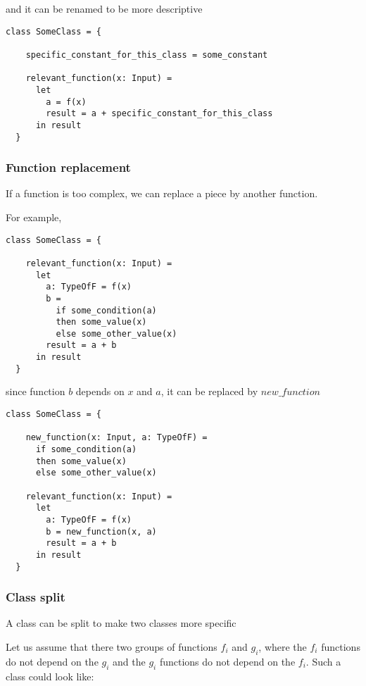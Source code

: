 and it can be renamed to be more descriptive

\begin{lstlisting}[label={lst:rewritingFunctionExtractionAfter1}]
  class SomeClass = {

    specific_constant_for_this_class = some_constant

    relevant_function(x: Input) =
      let
        a = f(x)
        result = a + specific_constant_for_this_class
      in result
  }
\end{lstlisting}

\subsubsection{Function replacement}

If a function is too complex, we can replace a piece by another function.

For example,

\begin{lstlisting}[label={lst:rewritingFunctionReplacementBefore}]
  class SomeClass = {

    relevant_function(x: Input) =
      let
        a: TypeOfF = f(x)
        b =
          if some_condition(a)
          then some_value(x)
          else some_other_value(x)
        result = a + b
      in result
  }
\end{lstlisting}

since function $b$ depends on $x$ and $a$, it can be replaced by $new\_function$

\begin{lstlisting}[label={lst:rewritingFunctionReplacementAfter}]
  class SomeClass = {

    new_function(x: Input, a: TypeOfF) =
      if some_condition(a)
      then some_value(x)
      else some_other_value(x)

    relevant_function(x: Input) =
      let
        a: TypeOfF = f(x)
        b = new_function(x, a)
        result = a + b
      in result
  }
\end{lstlisting}

\subsubsection{Class split}

A class can be split to make two classes more specific

Let us assume that there two groups of functions $f_{i}$ and $g_{i}$, where the $f_{i}$ functions do not depend on the $g_{i}$ and the $g_{i}$ functions do not depend on the $f_{i}$.
Such a class could look like:

